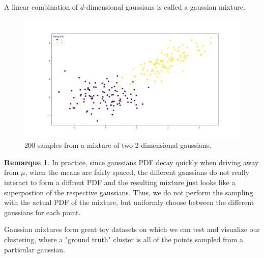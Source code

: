 \documentclass[a4paper,12pt]{article}
\theoremstyle{definition}
\newtheorem*{rem}{Remarque}
\theoremstyle{plain}
\begin{document}
A linear combination of $d$-dimensional gaussians is called a gaussian mixture.
\begin{figure}[H]
	\centering
	\includegraphics[width=0.6\linewidth]{figures/2gm}
	\caption{$200$ samples from a mixture of two 2-dimensional gaussians.}
	\label{fig:2gm}
\end{figure}
\begin{rem} 
	In practice, since gaussians PDF decay quickly when driving away from $\mu$, when the means are fairly spaced, the different gaussians do not really interact to form a diffrent PDF and the resulting mixture just looks like a superpostion of the respective gaussians. Thus, we do not perform the sampling with the actual PDF of the mixture, but uniformly choose between the different gaussians for each point.
\end{rem}
Gaussian mixtures form great toy datasets on which we can test and visualize our clustering, where a "ground truth" cluster is all of the points sampled from a particular gaussian.
\end{document}
